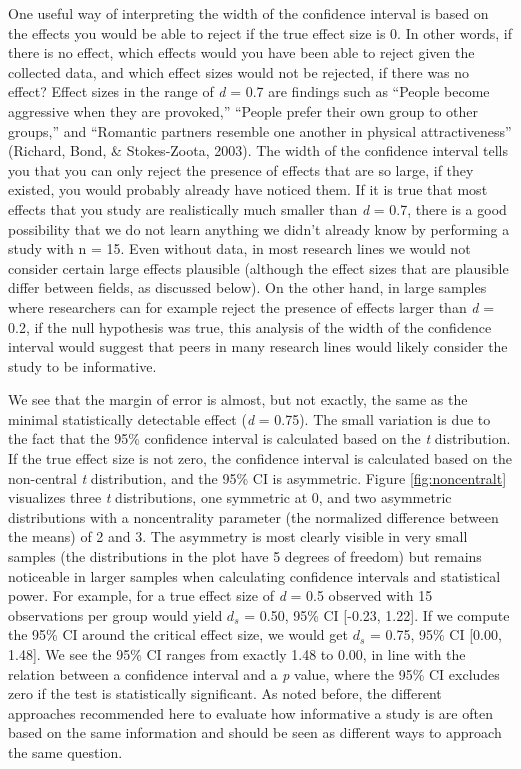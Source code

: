 \documentclass[
  english,
  ,jou, a4paper,floatsintext]{apa6}
\begin{document}
One useful way of interpreting the width of the confidence interval is based on the effects you would be able to reject if the true effect size is 0. In other words, if there is no effect, which effects would you have been able to reject given the collected data, and which effect sizes would not be rejected, if there was no effect? Effect sizes in the range of \emph{d} = 0.7 are findings such as ``People become aggressive when they are provoked,'' ``People prefer their own group to other groups,'' and ``Romantic partners resemble one another in physical attractiveness'' (Richard, Bond, \& Stokes-Zoota, 2003). The width of the confidence interval tells you that you can only reject the presence of effects that are so large, if they existed, you would probably already have noticed them. If it is true that most effects that you study are realistically much smaller than \emph{d} = 0.7, there is a good possibility that we do not learn anything we didn't already know by performing a study with n = 15. Even without data, in most research lines we would not consider certain large effects plausible (although the effect sizes that are plausible differ between fields, as discussed below). On the other hand, in large samples where researchers can for example reject the presence of effects larger than \emph{d} = 0.2, if the null hypothesis was true, this analysis of the width of the confidence interval would suggest that peers in many research lines would likely consider the study to be informative.

We see that the margin of error is almost, but not exactly, the same as the minimal statistically detectable effect (\emph{d} = 0.75). The small variation is due to the fact that the 95\% confidence interval is calculated based on the \emph{t} distribution. If the true effect size is not zero, the confidence interval is calculated based on the non-central \emph{t} distribution, and the 95\% CI is asymmetric. Figure \ref{fig:noncentralt} visualizes three \emph{t} distributions, one symmetric at 0, and two asymmetric distributions with a noncentrality parameter (the normalized difference between the means) of 2 and 3. The asymmetry is most clearly visible in very small samples (the distributions in the plot have 5 degrees of freedom) but remains noticeable in larger samples when calculating confidence intervals and statistical power. For example, for a true effect size of \emph{d} = 0.5 observed with 15 observations per group would yield \(d_s\) = 0.50, 95\% CI {[}-0.23, 1.22{]}. If we compute the 95\% CI around the critical effect size, we would get \(d_s\) = 0.75, 95\% CI {[}0.00, 1.48{]}. We see the 95\% CI ranges from exactly 1.48 to 0.00, in line with the relation between a confidence interval and a \emph{p} value, where the 95\% CI excludes zero if the test is statistically significant. As noted before, the different approaches recommended here to evaluate how informative a study is are often based on the same information and should be seen as different ways to approach the same question.
\end{document}
